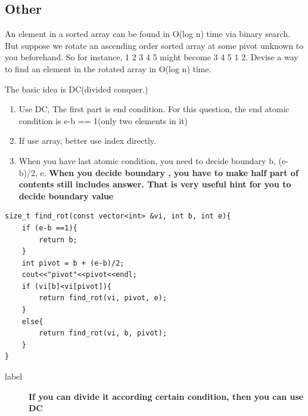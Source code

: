 \documentclass[a4paper,11pt,twoside]{book}
\begin{document}
\subsection{Other }

%


	\par An element in a sorted array can be found in O(log n) time via binary search. But suppose we rotate an ascending order sorted array at some pivot unknown to you beforehand. So for instance, 1 2 3 4 5 might become 3 4 5 1 2. Devise a way to find an element in the rotated array in O(log n) time.

The basic idea is DC(divided conquer.) 
\begin{enumerate}
	\item Use DC, The first part is end condition. For this question, the end atomic condition is e-b == 1(only two elements in it)
	\item If use array, better use index directly.
	\item When you have last atomic condition, you need to decide boundary  b, (e-b)/2, e. \textbf{When you decide boundary , you have to make half part of contents still includes answer. That is very useful hint for you to decide boundary value}
\end{enumerate}

\begin{lstlisting}[breaklines]
size_t find_rot(const vector<int> &vi, int b, int e){
	if (e-b ==1){
		return b;		
	}
	int pivot = b + (e-b)/2;
	cout<<"pivot"<<pivot<<endl;
	if (vi[b]<vi[pivot]){ 
		return find_rot(vi, pivot, e);
	}
	else{
		return find_rot(vi, b, pivot);
	}
}	
\end{lstlisting}
\begin{description}
	\item[label] \textbf{If you can divide it according certain condition, then you can use DC}
\end{description}
\end{document}
